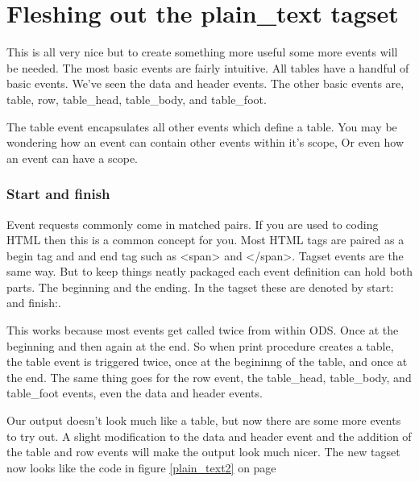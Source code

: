 \section{Fleshing out the plain\_text tagset}
This is all very nice but to create something more useful
some more events will be needed.  The most basic
events are fairly intuitive.  All tables have a handful
of basic events.  We've seen the data and header events.
The other basic events are, table, row, table\_head,  table\_body, and
 table\_foot.  

The table event encapsulates all other events which define a table.
You may be wondering how an event can contain other
events within it's scope, Or even how an event can have
a scope.

\subsubsection{Start and finish}
Event requests commonly come in matched pairs.  If you are
used to coding HTML then this is a common concept for you.
Most HTML tags are paired as a begin tag and and end tag such
as <span> and </span>.  Tagset events are the same way.  But
to keep things neatly packaged each event definition can hold
both parts.  The beginning and the ending.  In the tagset these
are denoted by start:  and finish:. 

This works because most events get called twice from within ODS.
Once at the beginning and then again at the end.  So when 
print procedure creates a table, the table event is triggered twice, once
at the begininng of the table, and once at the end.  The same
thing goes for the row event, the table\_head, table\_body, and table\_foot events,
even the data and header events.

Our output doesn't look much like a table, but now there are some
more events to try out.  A slight modification to the data and 
header event and the addition of the table and row events will make
the output look much nicer.
The new tagset now looks like the code in
figure \ref{plain_text2} on page \pageref{plain_text2} 

